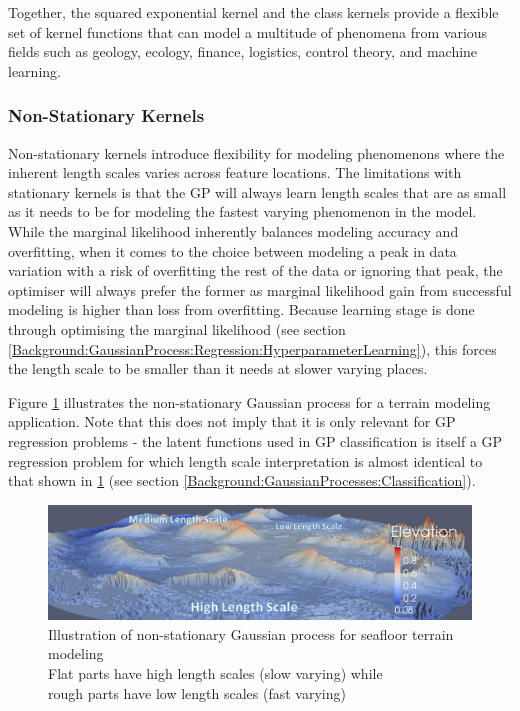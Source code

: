 				Together, the squared exponential kernel and the \matern class kernels provide a flexible set of kernel functions that can model a multitude of phenomena from various fields such as geology, ecology, finance, logistics, control theory, and machine learning.
			
			\subsubsection{Non-Stationary Kernels}
				
				Non-stationary kernels introduce flexibility for modeling phenomenons where the inherent length scales varies across feature locations. The limitations with stationary kernels is that the GP will always learn length scales that are as small as it needs to be for modeling the fastest varying phenomenon in the model. While the marginal likelihood inherently balances modeling accuracy and overfitting, when it comes to the choice between modeling a peak in data variation with a risk of overfitting the rest of the data or ignoring that peak, the optimiser will always prefer the former as marginal likelihood gain from successful modeling is higher than loss from overfitting. Because learning stage is done through optimising the marginal likelihood (see section \ref{Background:GaussianProcess:Regression:HyperparameterLearning}), this forces the length scale to be smaller than it needs at slower varying places.

				Figure \ref{Figure:GaussianProcessLengthScale} illustrates the non-stationary Gaussian process for a terrain modeling application. Note that this does not imply that it is only relevant for GP regression problems - the latent functions used in GP classification is itself a GP regression problem for which length scale interpretation is almost identical to that shown in \cref{Figure:GaussianProcessLengthScale} (see section \ref{Background:GaussianProcesses:Classification}).
				
				\begin{figure}[!htbp]
					\centering
						\includegraphics[width=\textwidth]{Figures/gaussianprocesslengthscale.png}
					\caption{Illustration of non-stationary Gaussian process for seafloor terrain modeling \citep{GaussianProcessTerrainFigure} \\
					Flat parts have high length scales (slow varying) while \\ rough parts have low length scales (fast varying)}
					\label{Figure:GaussianProcessLengthScale}
				\end{figure}
				
